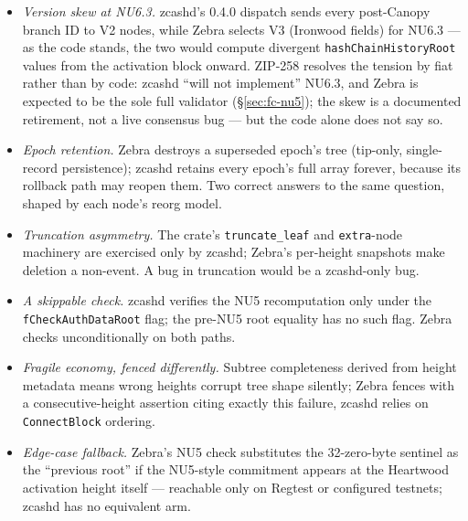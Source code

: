 \documentclass[11pt,a4paper]{article}
\theoremstyle{definition}
\begin{document}
\begin{itemize}[leftmargin=1.4em]
\item \emph{Version skew at NU6.3.} zcashd's 0.4.0 dispatch sends every
post-Canopy branch ID to V2 nodes, while Zebra selects V3 (Ironwood
fields) for NU6.3 --- as the code stands, the two would compute
divergent \texttt{hashChainHistoryRoot} values from the activation block
onward. ZIP-258 resolves the tension by fiat rather than by code:
zcashd ``will not implement'' NU6.3, and Zebra is expected to be the
sole full validator (\S\ref{sec:fc-nu5}); the skew is a documented
retirement, not a live consensus bug --- but the code alone does not
say so.
\item \emph{Epoch retention.} Zebra destroys a superseded epoch's tree
(tip-only, single-record persistence); zcashd retains every epoch's
full array forever, because its rollback path may reopen them. Two
correct answers to the same question, shaped by each node's reorg
model.
\item \emph{Truncation asymmetry.} The crate's \texttt{truncate\_leaf}
and \texttt{extra}-node machinery are exercised only by zcashd; Zebra's
per-height snapshots make deletion a non-event. A bug in truncation
would be a zcashd-only bug.
\item \emph{A skippable check.} zcashd verifies the NU5 recomputation
only under the \texttt{fCheckAuthDataRoot} flag; the pre-NU5 root
equality has no such flag. Zebra checks unconditionally on both paths.
\item \emph{Fragile economy, fenced differently.} Subtree completeness
derived from height metadata means wrong heights corrupt tree shape
silently; Zebra fences with a consecutive-height assertion citing
exactly this failure, zcashd relies on \texttt{ConnectBlock} ordering.
\item \emph{Edge-case fallback.} Zebra's NU5 check substitutes the
32-zero-byte sentinel as the ``previous root'' if the NU5-style
commitment appears at the Heartwood activation height itself ---
reachable only on Regtest or configured testnets; zcashd has no
equivalent arm.
\end{itemize}


\end{document}

